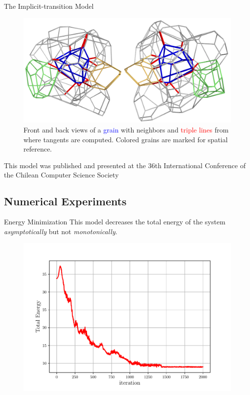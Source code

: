 \documentclass[usenames,dvipsnames]{beamer}
\begin{document}
\begin{frame}{The Implicit-transition Model}
\begin{figure}
    \centering
    \includegraphics[scale=0.25]{figures/extras/views.png}
    \caption{Front and back views of a \textcolor{blue}{grain} with neighbors and \textcolor{red}{triple lines} from where tangents are computed. Colored grains are marked for spatial reference.}
\end{figure}
This model was published and presented at the 36th International Conference of the Chilean Computer Science Society~\cite{sazo2017implicit}
\end{frame}

\subsection{Numerical Experiments}
\begin{frame}{Energy Minimization}
    This model decreases the total energy of the system \emph{asymptotically} but not \emph{monotonically}.
    \begin{figure}
        \centering
        \includegraphics[scale=0.5]
        {figures/3d_voronoi/3D_energy.pdf}
    \end{figure}
\end{frame}
\end{document}
